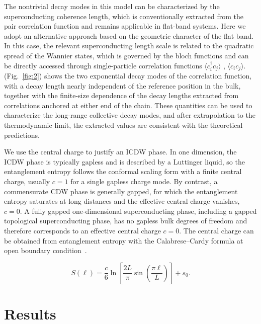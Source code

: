 \documentclass[
  prb,
  reprint,
  superscriptaddress,
  amsmath,
  amssymb,
  longbibliography
]{revtex4-2}
\begin{document}
The nontrivial decay modes in this model can be characterized by the superconducting coherence length, which is conventionally extracted from the pair correlation function and remains applicable in flat-band systems. Here we adopt an alternative approach based on the geometric character of the flat band. In this case, the relevant superconducting length scale is related to the quadratic spread of the Wannier states, which is governed by the bloch functions and can be directly accessed through single-particle correlation functions $\langle c^{\dagger}_i c_j\rangle$ , $\langle c_i c_j\rangle$. (Fig.~\ref{fig:2}) shows the two exponential decay modes of the correlation function, with a decay length nearly
independent of the reference position in the bulk,
together with the finite-size dependence of the decay
lengths extracted from correlations anchored at either
end of the chain. These quantities can be used to characterize the long-range collective decay modes, and after extrapolation to the thermodynamic limit, the extracted values are consistent with the theoretical predictions.






We use the central charge to justify an ICDW phase. In one dimension, the ICDW phase is typically gapless and is described by a Luttinger liquid, so the entanglement entropy follows the conformal scaling form with a finite central charge, usually \(c=1\) for a single gapless charge mode. By contrast, a commensurate CDW phase is generally gapped, for which the entanglement entropy saturates at long distances and the effective central charge vanishes, \(c=0\). A fully gapped one-dimensional superconducting phase, including a gapped topological superconducting phase, has no gapless bulk degrees of freedom and therefore corresponds to an effective central charge \(c=0\). The central charge can be obtained from entanglement entropy with the Calabrese–Cardy formula at open boundary condition~\cite{pasqualecalabreseEntanglementEntropyQuantum2004}.


\begin{equation}
S(\ell)=\frac{c}{6}\ln\left[\frac{2L}{\pi}\sin\left(\frac{\pi \ell}{L}\right)\right]+s_0.
\end{equation}




\section{Results}
\label{sec:results}
\end{document}
